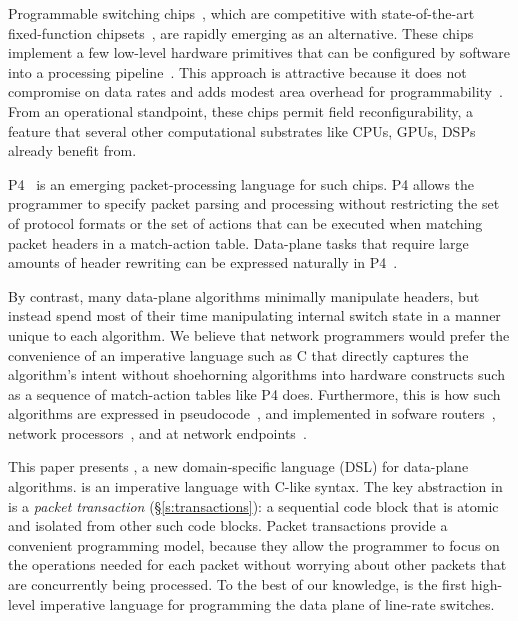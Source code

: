 Programmable switching chips~\cite{flexpipe, xpliant, rmt, corsa, uadp,
algo_logic}, which are competitive with state-of-the-art fixed-function
chipsets~\cite{trident, tomahawk, mellanox}, are rapidly emerging as an
alternative. These chips implement a few low-level hardware primitives that can
be configured by software into a processing
pipeline~\cite{xpliant_sdk,xpliant_sdk2,intel_sdk}.  This approach is
attractive because it does not compromise on data rates and adds modest area
overhead for programmability~\cite{rmt}. From an operational standpoint, these
chips permit field reconfigurability, a feature that several other
computational substrates like CPUs, GPUs, DSPs already benefit from.

P4~\cite{p4, p4spec} is an emerging packet-processing language for such chips.
P4 allows the programmer to specify packet parsing and processing without
restricting the set of protocol formats or the set of actions that can be
executed when matching packet headers in a match-action table. Data-plane tasks
that require large amounts of header rewriting can be expressed naturally in
P4~\cite{dc_p4}.

By contrast, many data-plane algorithms minimally manipulate headers, but
instead spend most of their time manipulating internal switch state in a manner
unique to each algorithm. We believe that network programmers would prefer the
convenience of an imperative language such as C that directly captures the
algorithm's intent without shoehorning algorithms into hardware constructs such
as a sequence of match-action tables like P4 does.  Furthermore, this is how
such algorithms are expressed in pseudocode~\cite{red, csfq, codel_code, avq,
blue}, and implemented in sofware routers~\cite{click, dpdk, routebricks},
network processors~\cite{packetc, nova}, and at network endpoints~\cite{qdisc}.

This paper presents \pktlanguage, a new domain-specific language (DSL) for
data-plane algorithms.  \pktlanguage is an imperative language with C-like
syntax. The key abstraction in \pktlanguage is a {\em packet transaction}
(\S\ref{s:transactions}): a sequential code block that is atomic and isolated
from other such code blocks. Packet transactions provide a convenient
programming model, because they allow the programmer to focus on the operations
needed for each packet without worrying about other packets that are
concurrently being processed. To the best of our knowledge, \pktlanguage is the
first high-level imperative language for programming the data plane of
line-rate switches.

